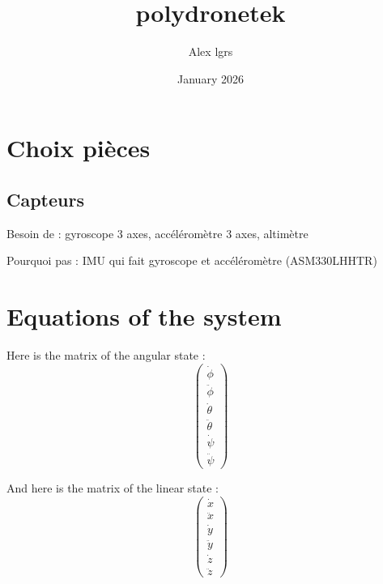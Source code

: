 \documentclass[12pt, a4paper]{article}
\title{polydronetek}
\author{Alex lgrs}
\date{January 2026}
\begin{document}
\maketitle

\section{Choix pièces}

\subsection{Capteurs}

Besoin de : gyroscope 3 axes, accéléromètre 3 axes, altimètre

Pourquoi pas : IMU qui fait gyroscope et accéléromètre (ASM330LHHTR)

\section{Equations of the system}

Here is the matrix of the angular state :
\begin{equation}
\begin{pmatrix}
\dot{\phi} \\
\ddot{\phi} \\
\dot{\theta} \\
\ddot{\theta} \\
\dot{\psi} \\
\ddot{\psi} 
\end{pmatrix}
\end{equation}

And here is the matrix of the linear state :
\begin{equation}
\begin{pmatrix}
\dot{x} \\
\ddot{x} \\
\dot{y} \\
\ddot{y} \\
\dot{z} \\
\ddot{z} 
\end{pmatrix}
\end{equation}
\end{document}
